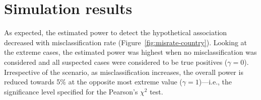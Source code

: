 \section{Simulation results}

As expected, the estimated power to detect the hypothetical association decreased with misclassification rate (Figure~\ref{fig:misrate-country}). Looking at the extreme cases, the estimated power was highest when no misclassification was considered and all suspected \cfs cases were considered to be true positives ($\gamma = 0$). Irrespective of the scenario, as misclassification increases, the overall power is reduced towards 5\% at the opposite most extreme value ($\gamma = 1$)---i.e., the significance level specified for the Pearson's $\chi^2$ test.

